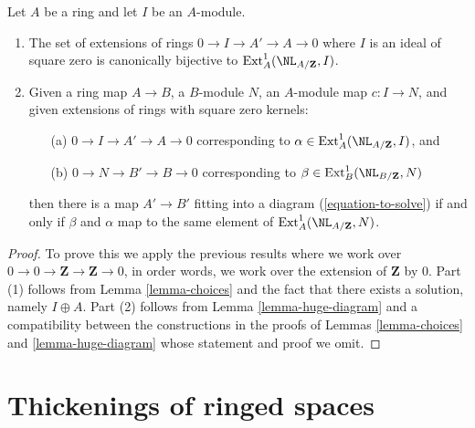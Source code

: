\begin{lemma}
\label{lemma-extensions-of-rings}
Let $A$ be a ring and let $I$ be an $A$-module.
\begin{enumerate}
\item The set of extensions of rings $0 \to I \to A' \to A \to 0$
where $I$ is an ideal of square zero is canonically bijective to
$\text{Ext}^1_A(\NL_{A/\mathbf{Z}}, I)$.
\item Given a ring map $A \to B$, a $B$-module $N$, an $A$-module
map $c : I \to N$, and given extensions of rings with square zero kernels:
\begin{enumerate}
\item[(a)] $0 \to I \to A' \to A \to 0$ corresponding to
$\alpha \in \text{Ext}^1_A(\NL_{A/\mathbf{Z}}, I)$, and
\item[(b)] $0 \to N \to B' \to B \to 0$ corresponding to
$\beta \in \text{Ext}^1_B(\NL_{B/\mathbf{Z}}, N)$
\end{enumerate}
then there is a map $A' \to B'$ fitting into a diagram
(\ref{equation-to-solve}) if and only if $\beta$ and $\alpha$
map to the same element of
$\text{Ext}^1_A(\NL_{A/\mathbf{Z}}, N)$.
\end{enumerate}
\end{lemma}

\begin{proof}
To prove this we apply the previous results where we work over
$0 \to 0 \to \mathbf{Z} \to \mathbf{Z} \to 0$, in order words,
we work over the extension of $\mathbf{Z}$ by $0$.
Part (1) follows from Lemma \ref{lemma-choices}
and the fact that there exists a solution, namely $I \oplus A$.
Part (2) follows from Lemma \ref{lemma-huge-diagram}
and a compatibility between the constructions in the proofs
of Lemmas \ref{lemma-choices} and \ref{lemma-huge-diagram}
whose statement and proof we omit.
\end{proof}








\section{Thickenings of ringed spaces}
\label{section-thickenings-spaces}


